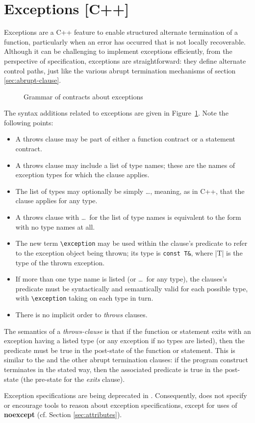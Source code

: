 \section{Exceptions [C++]}
\label{sec:exceptions}

Exceptions are a C++ feature to enable structured alternate termination of a function, particularly when an error has occurred that is not locally recoverable. Although it can be challenging to implement exceptions efficiently, from the perspective of specification, exceptions are straightforward: they define alternate control paths, just like the various abrupt termination mechanisms of section \ref{sec:abrupt-clause}.

\begin{figure}[t]
	\begin{cadre}
		
	\end{cadre}
	\caption{Grammar of contracts about exceptions}
	\label{fig:gram:throws-clause}
\end{figure}


The syntax additions related to exceptions are given in 
Figure~\ref{fig:gram:throws-clause}. Note the following points:
\begin{itemize}
\item A throws clause may be part of either a function contract or a statement contract.
\item A throws clause may include a list of type names; these are the names of exception types for which the
clause applies.
\item The list of types may optionally be simply \ldots, meaning, as in C++, that the clause applies for any type.
\item A throws clause with \ldots~for the list of type names is equivalent to the form with no type names at all.
\item The new term \lstinline|\exception| may be used within the clause's predicate to refer to the exception object being thrown; its type is \lstinline|const T&|, where \lstlinline|T| is the type of the thrown exception.
\item If more than one type name is listed (or \ldots~for any type), the clauses's predicate must be syntactically and semantically valid for each possible type, with \lstinline|\exception| taking on each type in turn.
\item There is no implicit order to \textsl{throws} clauses.
\end{itemize}
The semantics of a \textsl{throws-clause} is that if the function or statement exits with an exception having a listed type (or any exception if no types are listed), then the predicate must be true in the post-state of the function or statement. This is similar to the \ensures and the other abrupt termination clauses: if the program construct terminates in the stated way, then the associated predicate is true in the post-state (the pre-state for the \textsl{exits} clause).

Exception specifications are being deprecated in \lang. Consequently, \NAME does not specify or encourage tools to reason about \lang exception specifications, except for  uses of \textbf{noexcept} (cf. Section \ref{sec:attributes}).

